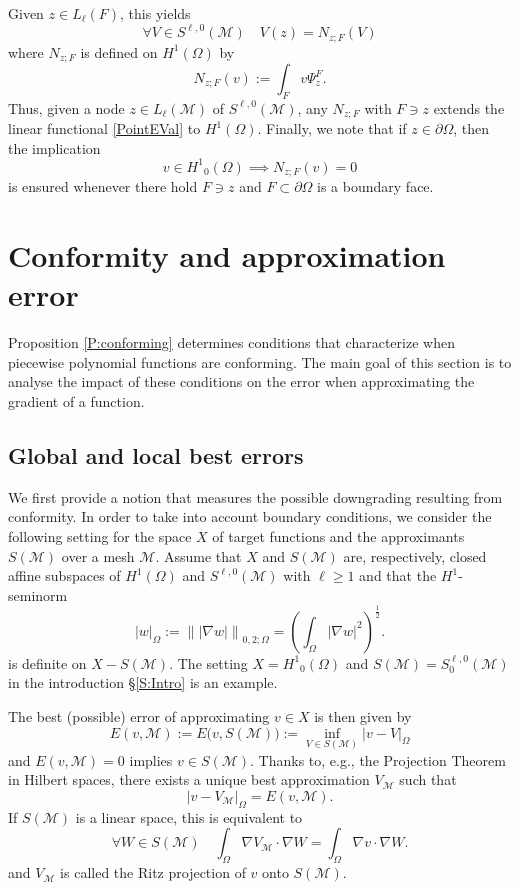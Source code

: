 \documentclass[a4paper]{amsart}
\numberwithin{equation}{section}
\theoremstyle{plain}
\theoremstyle{definition}
\begin{document}
Given $z\in{L_{{\ell}}}({F})$, this yields
\[
 \forall V\in{S}^{{\ell},0}({\mathcal{M}})
\quad 
 V(z) = {N}_{z;{F}}(V)
\]
where ${N}_{z;{F}}$ is defined on ${H^{{1}}}(\Omega)$ by
\begin{equation}
\label{ScottZhangFct}
 {N}_{z;{F}}(v)
 {:=}
 \int_F v {\Psi}_z^{F}.
\end{equation}
Thus, given a node $z\in{L_{{\ell}}}({\mathcal{M}})$ of
${S}^{{\ell},0}({\mathcal{M}})$, any ${N}_{z;{F}}$ with ${F} \ni
z$ extends the linear functional \eqref{PointEVal} to
${H^{{1}}}(\Omega)$. Finally, we note that if $z\in\partial\Omega$,
then the implication
\[
 v\in{H^{{1}}}_0(\Omega)
 \implies
 N_{z;F}(v) = 0
\]
is ensured whenever there hold $F\ni z$ and $F\subset\partial\Omega$ is a 
boundary face.

\section{Conformity and approximation error}
\label{S:ConformityImpact}
Proposition \ref{P:conforming} determines conditions that characterize when 
piecewise polynomial functions are conforming.  The main goal of this section is 
to analyse the impact of these conditions on the error when approximating the 
gradient of a function.

\subsection{Global and local best errors}
\label{S:best-errors}
We first provide a notion that measures the possible downgrading resulting from
conformity.  In order to take into account boundary conditions, we consider the 
following setting for the space $X$ of target functions and the approximants 
${S}({\mathcal{M}})$ over a mesh ${\mathcal{M}}$.  Assume that $X$ and ${S}({\mathcal{M}})$ 
are, respectively, closed affine subspaces of ${H^{1}}(\Omega)$ and 
${S}^{{\ell},0}({\mathcal{M}})$ with ${\ell}\geq1$ and that the ${H^{1}}$-seminorm
\begin{equation}
\label{H1seminorm}
 {\left|{w}\right|_{{\Omega}}}
 {:=}
 {{\left\|{{|{\nabla} w|}}\right\|_{{0,2;\Omega}}}}
 =
 \left( \int_\Omega |{\nabla} w|^2 \right)^{\frac12}.
\end{equation}
is definite on $X-{S}({\mathcal{M}})$.   The setting $X={H^{1}}_0(\Omega)$ and
${S}({\mathcal{M}})={S}^{{\ell},0}_0({\mathcal{M}})$ in the introduction 
\S\ref{S:Intro} is an example.

The best (possible) error of approximating $v\in X$ is then given by
\[
 E(v,{\mathcal{M}})
 {:=}
 E\big( v,{S}({\mathcal{M}}) \big)
 {:=}
 \inf_{V\in{S}({\mathcal{M}})} {\left|{v-V}\right|_{{\Omega}}}
\]
and $E(v,{\mathcal{M}})=0$ implies $v\in{S}({\mathcal{M}})$. Thanks to, e.g., the
Projection Theorem in Hilbert spaces, there exists a unique best
approximation $V_{\mathcal{M}}$ such that
\[
 {\left|{v-V_{\mathcal{M}}}\right|_{{\Omega}}}
 =
 E(v,{\mathcal{M}}).
\]
If $S({\mathcal{M}})$ is a linear space, this is  equivalent to
\[
 \forall W\in{S}({\mathcal{M}})
\quad
 \int_\Omega {\nabla} V_{\mathcal{M}} \cdot {\nabla} W
 =
  \int_\Omega {\nabla} v \cdot {\nabla} W.
\]
and $V_{\mathcal{M}}$ is called the Ritz projection of $v$ onto ${S}({\mathcal{M}})$.
\end{document}
